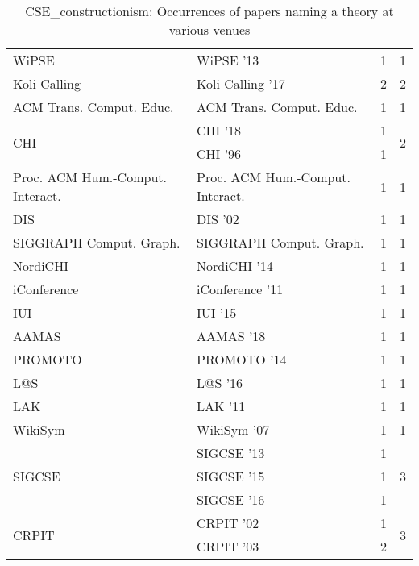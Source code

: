 \begin{table*}[t]
\begin{tabular}{llrr}
\multirow{1}{*}{WiPSE } & WiPSE '13 & 1 & \multirow{1}{*}{1}\\
\multirow{1}{*}{Koli Calling } & Koli Calling '17 & 2 & \multirow{1}{*}{2}\\
\multirow{1}{*}{ACM Trans. Comput. Educ.} & ACM Trans. Comput. Educ. & 1 & \multirow{1}{*}{1}\\
\multirow{2}{*}{CHI } & CHI '18 & 1 & \multirow{2}{*}{2}\\
& CHI '96 & 1 &\\
\multirow{1}{*}{Proc. ACM Hum.-Comput. Interact.} & Proc. ACM Hum.-Comput. Interact. & 1 & \multirow{1}{*}{1}\\
\multirow{1}{*}{DIS } & DIS '02 & 1 & \multirow{1}{*}{1}\\
\multirow{1}{*}{SIGGRAPH Comput. Graph.} & SIGGRAPH Comput. Graph. & 1 & \multirow{1}{*}{1}\\
\multirow{1}{*}{NordiCHI } & NordiCHI '14 & 1 & \multirow{1}{*}{1}\\
\multirow{1}{*}{iConference } & iConference '11 & 1 & \multirow{1}{*}{1}\\
\multirow{1}{*}{IUI } & IUI '15 & 1 & \multirow{1}{*}{1}\\
\multirow{1}{*}{AAMAS } & AAMAS '18 & 1 & \multirow{1}{*}{1}\\
\multirow{1}{*}{PROMOTO } & PROMOTO '14 & 1 & \multirow{1}{*}{1}\\
\multirow{1}{*}{L@S } & L@S '16 & 1 & \multirow{1}{*}{1}\\
\multirow{1}{*}{LAK } & LAK '11 & 1 & \multirow{1}{*}{1}\\
\multirow{1}{*}{WikiSym } & WikiSym '07 & 1 & \multirow{1}{*}{1}\\
\multirow{3}{*}{SIGCSE } & SIGCSE '13 & 1 & \multirow{3}{*}{3}\\
& SIGCSE '15 & 1 &\\
& SIGCSE '16 & 1 &\\
\multirow{2}{*}{CRPIT } & CRPIT '02 & 1 & \multirow{2}{*}{3}\\
& CRPIT '03 & 2 &\\
\end{tabular}
\caption{CSE\_constructionism: Occurrences of papers naming a theory at various venues}
\end{table*}